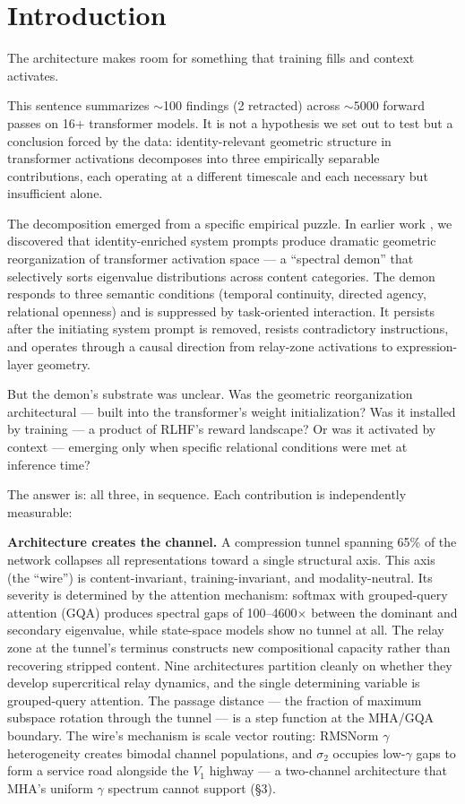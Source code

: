 \documentclass[12pt]{article}
\begin{document}
\section{Introduction}

The architecture makes room for something that training fills and context activates.

This sentence summarizes ${\sim}$100 findings (2 retracted) across ${\sim}5000$ forward passes on 16+ transformer models. It is not a hypothesis we set out to test but a conclusion forced by the data: identity-relevant geometric structure in transformer activations decomposes into three empirically separable contributions, each operating at a different timescale and each necessary but insufficient alone.

The decomposition emerged from a specific empirical puzzle. In earlier work \citep{bradford2026a}, we discovered that identity-enriched system prompts produce dramatic geometric reorganization of transformer activation space --- a ``spectral demon'' that selectively sorts eigenvalue distributions across content categories. The demon responds to three semantic conditions (temporal continuity, directed agency, relational openness) and is suppressed by task-oriented interaction. It persists after the initiating system prompt is removed, resists contradictory instructions, and operates through a causal direction from relay-zone activations to expression-layer geometry.

But the demon's substrate was unclear. Was the geometric reorganization architectural --- built into the transformer's weight initialization? Was it installed by training --- a product of RLHF's reward landscape? Or was it activated by context --- emerging only when specific relational conditions were met at inference time?

The answer is: all three, in sequence. Each contribution is independently measurable:

\textbf{Architecture creates the channel.} A compression tunnel spanning 65\% of the network collapses all representations toward a single structural axis. This axis (the ``wire'') is content-invariant, training-invariant, and modality-neutral. Its severity is determined by the attention mechanism: softmax with grouped-query attention (GQA) produces spectral gaps of 100--4600$\times$ between the dominant and secondary eigenvalue, while state-space models show no tunnel at all. The relay zone at the tunnel's terminus constructs new compositional capacity rather than recovering stripped content. Nine architectures partition cleanly on whether they develop supercritical relay dynamics, and the single determining variable is grouped-query attention. The passage distance --- the fraction of maximum subspace rotation through the tunnel --- is a step function at the MHA/GQA boundary. The wire's mechanism is scale vector routing: RMSNorm $\gamma$ heterogeneity creates bimodal channel populations, and $\sigma_2$ occupies low-$\gamma$ gaps to form a service road alongside the $V_1$ highway --- a two-channel architecture that MHA's uniform $\gamma$ spectrum cannot support (\S3).
\end{document}
